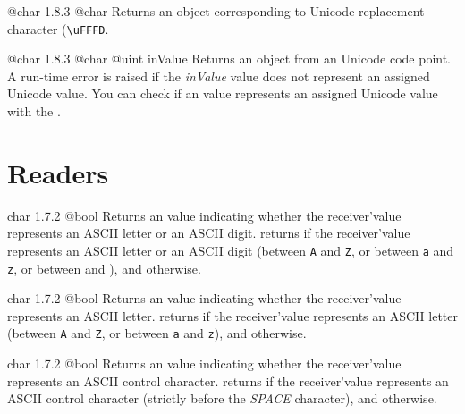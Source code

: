 {@char}
{1.8.3}
{@char}
{Returns an  object corresponding to Unicode replacement character (\texttt{\textquotesingle\textbackslash uFFFD}.}
{}







{@char}
{1.8.3}
{@char}
{@uint inValue}
{Returns an  object from an Unicode code point.}
{A run-time error is raised if the \emph{inValue} value does not represent an assigned Unicode value. You can check if an  value represents an assigned Unicode value with the .}


\section{Readers}


{char}
{1.7.2}
{@bool}
{Returns an  value indicating whether the receiver'value represents an ASCII letter or an ASCII digit.}
{returns  if the receiver'value represents an ASCII letter or an ASCII digit (between \texttt{\textquotesingle A\textquotesingle} and \texttt{\textquotesingle Z\textquotesingle}, or between \texttt{\textquotesingle a\textquotesingle} and \texttt{\textquotesingle z\textquotesingle}, or between \texttt{\textquotesingle} and \texttt{\textquotesingle}), and  otherwise.}




{char}
{1.7.2}
{@bool}
{Returns an  value indicating whether the receiver'value represents an ASCII letter.}
{returns  if the receiver'value represents an ASCII letter (between \texttt{\textquotesingle A\textquotesingle} and \texttt{\textquotesingle Z\textquotesingle}, or between \texttt{\textquotesingle a\textquotesingle} and \texttt{\textquotesingle z\textquotesingle}), and  otherwise.}




{char}
{1.7.2}
{@bool}
{Returns an  value indicating whether the receiver'value represents an ASCII control character.}
{returns  if the receiver'value represents an ASCII control character (strictly before the \emph{SPACE} character), and  otherwise.}





